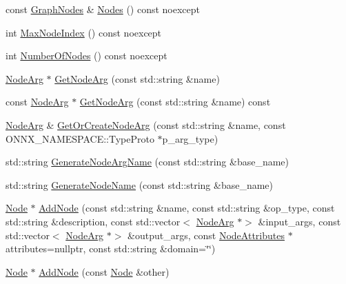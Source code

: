 \begin{DoxyCompactItemize}
\item 
const \mbox{\hyperlink{classonnxruntime_1_1GraphNodes}{Graph\+Nodes}} \& \mbox{\hyperlink{classonnxruntime_1_1Graph_a6ebaafa47a4b7516769b9ea5f57e3792}{Nodes}} () const noexcept
\item 
int \mbox{\hyperlink{classonnxruntime_1_1Graph_a7164d4ed047a5359058c3fd87bea5ce1}{Max\+Node\+Index}} () const noexcept
\item 
int \mbox{\hyperlink{classonnxruntime_1_1Graph_addf43a7353a5eb2713f2f25d067e548f}{Number\+Of\+Nodes}} () const noexcept
\item 
\mbox{\hyperlink{classonnxruntime_1_1NodeArg}{Node\+Arg}} $\ast$ \mbox{\hyperlink{classonnxruntime_1_1Graph_ae7aacecdca718dca43c64ac05cdc1c91}{Get\+Node\+Arg}} (const std\+::string \&name)
\item 
const \mbox{\hyperlink{classonnxruntime_1_1NodeArg}{Node\+Arg}} $\ast$ \mbox{\hyperlink{classonnxruntime_1_1Graph_a1246bcd9846dcc887e9c2c30ea36a7b9}{Get\+Node\+Arg}} (const std\+::string \&name) const
\item 
\mbox{\hyperlink{classonnxruntime_1_1NodeArg}{Node\+Arg}} \& \mbox{\hyperlink{classonnxruntime_1_1Graph_a89e037a8adec37ab95c8da2c725bba8f}{Get\+Or\+Create\+Node\+Arg}} (const std\+::string \&name, const O\+N\+N\+X\+\_\+\+N\+A\+M\+E\+S\+P\+A\+C\+E\+::\+Type\+Proto $\ast$p\+\_\+arg\+\_\+type)
\item 
std\+::string \mbox{\hyperlink{classonnxruntime_1_1Graph_a2c3e936d9d58b04ba1e7f93a9d41dab6}{Generate\+Node\+Arg\+Name}} (const std\+::string \&base\+\_\+name)
\item 
std\+::string \mbox{\hyperlink{classonnxruntime_1_1Graph_ab9b804ad292ab80434def67fd8d6c436}{Generate\+Node\+Name}} (const std\+::string \&base\+\_\+name)
\item 
\mbox{\hyperlink{classonnxruntime_1_1Node}{Node}} $\ast$ \mbox{\hyperlink{classonnxruntime_1_1Graph_aac8515a9a51b8fc25bff257c4e1c0bb6}{Add\+Node}} (const std\+::string \&name, const std\+::string \&op\+\_\+type, const std\+::string \&description, const std\+::vector$<$ \mbox{\hyperlink{classonnxruntime_1_1NodeArg}{Node\+Arg}} $\ast$$>$ \&input\+\_\+args, const std\+::vector$<$ \mbox{\hyperlink{classonnxruntime_1_1NodeArg}{Node\+Arg}} $\ast$$>$ \&output\+\_\+args, const \mbox{\hyperlink{namespaceonnxruntime_a7fa616c461850e300cfa552afd46eed4}{Node\+Attributes}} $\ast$attributes=nullptr, const std\+::string \&domain=\char`\"{}\char`\"{})
\item 
\mbox{\hyperlink{classonnxruntime_1_1Node}{Node}} $\ast$ \mbox{\hyperlink{classonnxruntime_1_1Graph_a667f9dc9ebc7f8d3d0737161fbcee1cd}{Add\+Node}} (const \mbox{\hyperlink{classonnxruntime_1_1Node}{Node}} \&other)

\end{DoxyCompactItemize}

